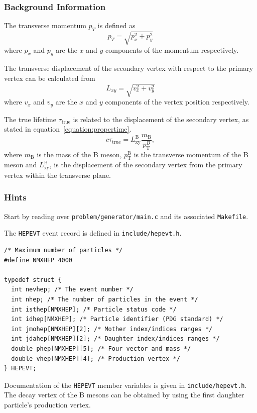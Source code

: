 \documentclass[11pt]{scrartcl}
\begin{document}
\subsubsection*{Background Information}
The transverse momentum $p_T$ is defined as
\[p_T = \sqrt{p_x^2 + p_y^2} \]
where $p_x$ and $p_y$ are the $x$ and $y$ components of the
momentum respectively.

The transverse displacement of the secondary vertex with respect to
the primary vertex can be calculated from
\[ L_{xy} = \sqrt{v_x^2 + v_y^2} \]
where $v_x$ and $v_y$ are the $x$ and $y$ components of the
vertex position respectively.

The true lifetime $\tau_\mathrm{true}$ is related to the displacement of the
secondary vertex, as stated in equation~\ref{equation:propertime}.
\begin{equation}
c\tau_\mathrm{true} = L_\mathrm{xy}^\mathrm{B} \frac{m_\mathrm{B}}{p_\mathrm{T}^B},
\label{equation:propertime}
\end{equation}
where $m_\mathrm{B}$ is the mass of the B meson, $p_\mathrm{T}^\mathrm{B}$ is the transverse
momentum of the B meson and $L_\mathrm{xy}^\mathrm{B}$, is the displacement of the
secondary vertex from the primary vertex within the transverse plane.

\subsubsection*{Hints}
Start by reading over \texttt{problem/generator/main.c} and its
associated \texttt{Makefile}.

The \texttt{HEPEVT} event record is defined in \texttt{include/hepevt.h}.
\begin{lstlisting}
/* Maximum number of particles */
#define NMXHEP 4000

typedef struct {
  int nevhep; /* The event number */
  int nhep; /* The number of particles in the event */
  int isthep[NMXHEP]; /* Particle status code */
  int idhep[NMXHEP]; /* Particle identifier (PDG standard) */
  int jmohep[NMXHEP][2]; /* Mother index/indices ranges */
  int jdahep[NMXHEP][2]; /* Daughter index/indices ranges */
  double phep[NMXHEP][5]; /* Four vector and mass */
  double vhep[NMXHEP][4]; /* Production vertex */
} HEPEVT;
\end{lstlisting}
Documentation of the \texttt{HEPEVT} member variables is given in
\texttt{include/hepevt.h}.  The decay vertex of the B mesons can be
obtained by using the first daughter particle's production vertex.
\end{document}
